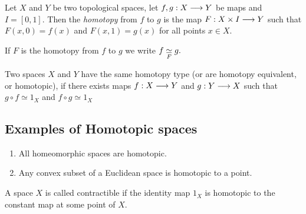 \begin{defn}[Homotopy]
Let $X$ and $Y$ be two topological spaces, let $f,g : X \longrightarrow Y$ be maps and $I = [0,1]$. Then the \textit{homotopy} from $f$ to $g$ is the map $F: X \times I \longrightarrow Y$ such that $F(x,0) = f(x)$ and $F(x,1) = g(x)$ for all points $x \in X$.
\end{defn}

\begin{notn}
If $F$ is the homotopy from $f$ to $g$ we write $\displaystyle f \underset{F}{\simeq} g.$
\end{notn}

\begin{defn}
Two spaces $X$ and $Y$ have the same homotopy type (or are homotopy equivalent, or homotopic), if there exists maps $f: X \longrightarrow Y$ and $g : Y \longrightarrow X$ such that $g \circ f \simeq 1_X$ and $f \circ g \simeq 1_X$
\end{defn}

\subsection*{Examples of Homotopic spaces}
\begin{enumerate}
\item All homeomorphic spaces are homotopic.
\item Any convex subset of a Euclidean space is homotopic to a point.
\end{enumerate}

\begin{defn}
A space $X$ is called contractible if the identity map $1_X$ is homotopic to the constant map at some point of $X$.
\end{defn}